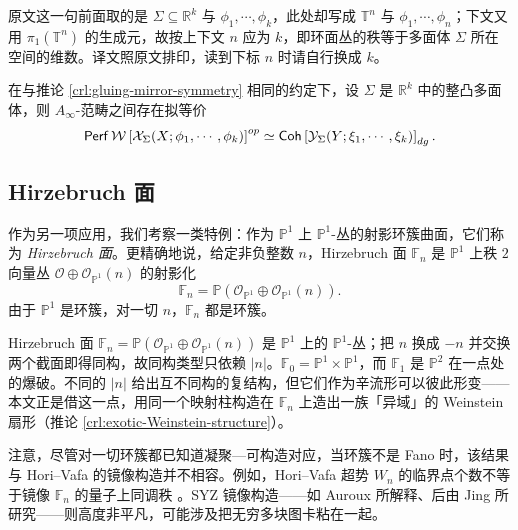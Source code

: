 \begin{yizhu}
原文这一句前面取的是 $\Sigma\subseteq\mathbb{R}^k$ 与 $\phi_1,\dotsb,\phi_k$，此处却写成 $\mathbb{T}^n$ 与 $\phi_1,\dotsb,\phi_n$；下文又用 $\pi_1(\mathbb{T}^n)$ 的生成元，故按上下文 $n$ 应为 $k$，即环面丛的秩等于多面体 $\Sigma$ 所在空间的维数。译文照原文排印，读到下标 $n$ 时请自行换成 $k$。
\end{yizhu}

\begin{crl}\label{crl:toric-bundle-HMS}
    在与推论 \ref{crl:gluing-mirror-symmetry} 相同的约定下，设 $\Sigma$ 是 $\mathbb{R}^k$ 中的整凸多面体，则 $A_{\infty}$-范畴之间存在拟等价 \[
    \operatorname{\mathsf{Perf}}\mathcal{W}\left[\mathcal{X}_{\Sigma} (X;\phi_1,\dotsb ,\phi_k)\right]^{op}\simeq\operatorname{\mathsf{Coh}}\left[\mathcal{Y}_{\Sigma} (Y;\xi_1,\dotsb ,\xi_k)\right]_{dg}.
    \]
\end{crl}

\subsection{Hirzebruch 面}

作为另一项应用，我们考察一类特例：作为 $\mathbb{P}^1$ 上 $\mathbb{P}^1$-丛的射影环簇曲面，它们称为 \emph{Hirzebruch 面}。更精确地说，给定非负整数 $n$，Hirzebruch 面 $\mathbb{F}_n$ 是 $\mathbb{P}^1$ 上秩 $2$ 向量丛 $\mathcal{O}\oplus\mathcal{O}_{\mathbb{P}^1} (n)$ 的射影化
\[
    \mathbb{F}_n =\mathbb{P}\left(\mathcal{O}_{\mathbb{P}^1}\oplus\mathcal{O}_{\mathbb{P}^1}(n)\right).
\]
由于 $\mathbb{P}^1$ 是环簇，对一切 $n$，$\mathbb{F}_n$ 都是环簇。

\begin{conceptbox}{Hirzebruch 面}
$\mathbb{F}_n=\mathbb{P}\left(\mathcal{O}_{\mathbb{P}^1}\oplus\mathcal{O}_{\mathbb{P}^1}(n)\right)$ 是 $\mathbb{P}^1$ 上的 $\mathbb{P}^1$-丛；把 $n$ 换成 $-n$ 并交换两个截面即得同构，故同构类型只依赖 $|n|$。$\mathbb{F}_0=\mathbb{P}^1\times\mathbb{P}^1$，而 $\mathbb{F}_1$ 是 $\mathbb{P}^2$ 在一点处的爆破。不同的 $|n|$ 给出互不同构的复结构，但它们作为辛流形可以彼此形变——本文正是借这一点，用同一个映射柱构造在 $\mathbb{F}_n$ 上造出一族「异域」的 Weinstein 扇形（推论 \ref{crl:exotic-Weinstein-structure}）。
\par\smallskip{}
\end{conceptbox}

注意，尽管对一切环簇都已知道凝聚—可构造对应，当环簇不是 Fano 时，该结果与 Hori--Vafa \cite{HV00} 的镜像构造并不相容。例如，Hori--Vafa 超势 $W_n$ 的临界点个数不等于镜像 $\mathbb{F}_n$ 的量子上同调秩 \cite[Example 8.2]{FOOO10}。SYZ 镜像构造——如 Auroux \cite{Auroux09} 所解释、后由 Jing \cite{Jing26} 所研究——则高度非平凡，可能涉及把无穷多块图卡粘在一起。

